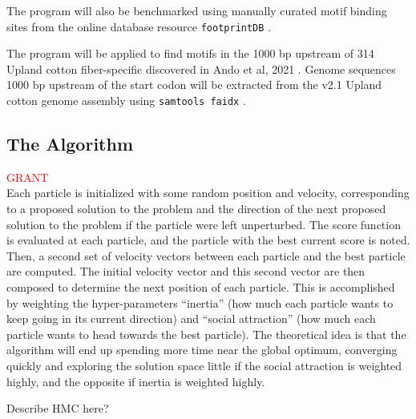\documentclass{article}
\begin{document}
  The program will also be benchmarked using manually curated motif binding sites from the online database resource \texttt{footprintDB} \cite{sebastian2014footprintdb}.  

  The program will be applied to find motifs in the 1000 bp upstream of 314 Upland cotton fiber-specific discovered in Ando et al, 2021 \cite{ando2021lcm}. Genome sequences 1000 bp upstream of the start codon will be extracted from the v2.1 Upland cotton genome assembly \cite{chen2020genomic} using \texttt{samtools faidx} \cite{li2009sequence}.
\subsection{The Algorithm}
\textcolor{red}{GRANT} \\
Each particle is initialized with some random position and velocity, corresponding to a proposed solution to the problem and the direction of the next proposed solution to the problem if the particle were left unperturbed. The score function is evaluated at each particle, and the particle with the best current score is noted. Then, a second set of velocity vectors between each particle and the best particle are computed. The initial velocity vector and this second vector are then composed to determine the next position of each particle. This is accomplished by weighting the hyper-parameters ``inertia'' (how much each particle wants to keep going in its current direction) and ``social attraction'' (how much each particle wants to head towards the best particle). The theoretical idea is that the algorithm will end up spending more time near the global optimum, converging quickly and exploring the solution space little if the social attraction is weighted highly, and the opposite if inertia is weighted highly.  
  
Describe HMC here? \cite{betancourt2017conceptual}
\end{document}
